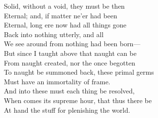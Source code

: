Solid, without a void, they must be then\\
Eternal; and, if matter ne'er had been\\
Eternal, long ere now had all things gone\\
Back into nothing utterly, and all\\
We see around from nothing had been born—\\
But since I taught above that naught can be\\
From naught created, nor the once begotten\\
To naught be summoned back, these primal germs\\
Must have an immortality of frame.\\
And into these must each thing be resolved,\\
When comes its supreme hour, that thus there be\\
At hand the stuff for plenishing the world.

